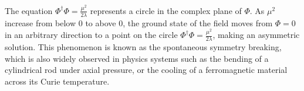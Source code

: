 The equation $\Phi^{\dagger}\Phi = \frac{\mu^{2}}{2\lambda}$ represents a circle in the complex plane of $\Phi$.
As $\mu^{2}$ increase from below 0 to above 0, 
the ground state of the field moves from $\Phi = 0$ in an arbitrary direction to a point on the circle $\Phi^{\dagger}\Phi = \frac{\mu^{2}}{2\lambda}$, 
making an asymmetric solution.
This phenomenon is known as the spontaneous symmetry breaking, 
which is also widely observed in physics systems such as the 
bending of a cylindrical rod under axial pressure,
or the cooling of a ferromagnetic material across its Curie temperature.



